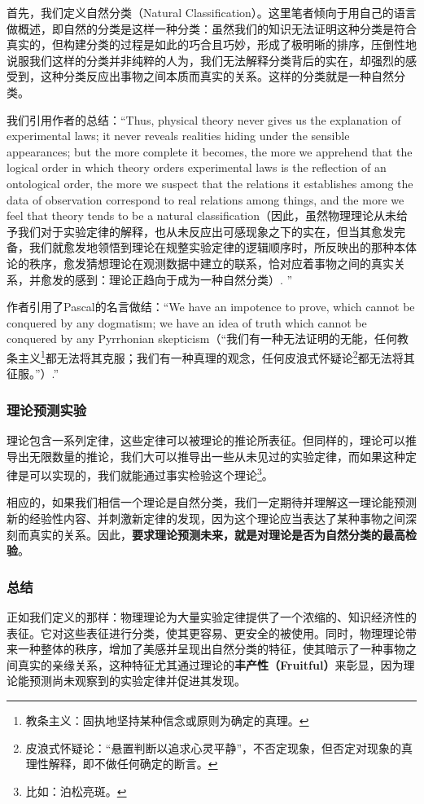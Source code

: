 \documentclass[12pt, a4paper, oneside]{ctexart}
\renewcommand{\b}{\textbf}
\newcommand{\f}{\footnote}
\begin{document}
首先，我们定义自然分类（Natural Classification）。这里笔者倾向于用自己的语言做概述，即自然的分类是这样一种分类：虽然我们的知识无法证明这种分类是符合真实的，但构建分类的过程是如此的巧合且巧妙，形成了极明晰的排序，压倒性地说服我们这样的分类并非纯粹的人为，我们无法解释分类背后的实在，却强烈的感受到，这种分类反应出事物之间本质而真实的关系。这样的分类就是一种自然分类。

我们引用作者的总结：“Thus, physical theory never gives us the explanation of experimental laws; it never reveals realities hiding under the sensible appearances; but the more complete it becomes, the more we apprehend that the logical order in which theory orders experimental laws is the reflection of an ontological order, the more we suspect that the relations it establishes among the data of observation correspond to real relations among things, and the more we feel that theory tends to be a natural classification（因此，虽然物理理论从未给予我们对于实验定律的解释，也从未反应出可感现象之下的实在，但当其愈发完备，我们就愈发地领悟到理论在规整实验定律的逻辑顺序时，所反映出的那种本体论的秩序，愈发猜想理论在观测数据中建立的联系，恰对应着事物之间的真实关系，并愈发的感到：理论正趋向于成为一种自然分类）. ”

作者引用了Pascal的名言做结：“We have an impotence to prove, which cannot be conquered by any dogmatism; we have an idea of truth which cannot be conquered by any Pyrrhonian skepticism（“我们有一种无法证明的无能，任何教条主义\f{教条主义：固执地坚持某种信念或原则为确定的真理。}都无法将其克服；我们有一种真理的观念，任何皮浪式怀疑论\f{皮浪式怀疑论：“悬置判断以追求心灵平静”，不否定现象，但否定对现象的真理性解释，即不做任何确定的断言。}都无法将其征服。”）.”

\subsubsection{理论预测实验}
理论包含一系列定律，这些定律可以被理论的推论所表征。但同样的，理论可以推导出无限数量的推论，我们大可以推导出一些从未见过的实验定律，而如果这种定律是可以实现的，我们就能通过事实检验这个理论\f{比如：泊松亮斑。}。

相应的，如果我们相信一个理论是自然分类，我们一定期待并理解这一理论能预测新的经验性内容、并刺激新定律的发现，因为这个理论应当表达了某种事物之间深刻而真实的关系。因此，\b{要求理论预测未来，就是对理论是否为自然分类的最高检验}。

\subsubsection{总结}
正如我们定义的那样：物理理论为大量实验定律提供了一个浓缩的、知识经济性的表征。它对这些表征进行分类，使其更容易、更安全的被使用。同时，物理理论带来一种整体的秩序，增加了美感并呈现出自然分类的特征，使其暗示了一种事物之间真实的亲缘关系，这种特征尤其通过理论的\b{丰产性（Fruitful）}来彰显，因为理论能预测尚未观察到的实验定律并促进其发现。
\end{document}
